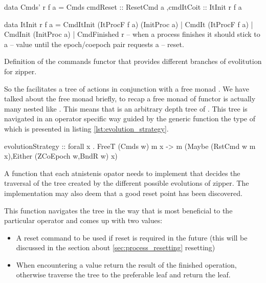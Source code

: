 \begin{code}
\begin{haskellcode}
data Cmds' r f a =
  Cmds { cmdReset :: ResetCmd a
        ,cmdItCoit :: ItInit r f a
       }

data ItInit r f a
  = CmdItInit (ItProcF f a) (InitProc a)
  | CmdIt (ItProcF f a)
  | CmdInit (InitProc a)
  | CmdFinished r -- when a process finishes it should stick to a
                  -- value until the epoch/coepoch pair requests a
                  -- reset.
\end{haskellcode}
\label{lst:cmds_def}
\caption{Definition of the commands functor that provides different
  branches of evolitution for zipper.}
\end{code}

So the  facilitates a tree of actions in conjunction with a
free monad .  We have talked about the free monad briefly, to recap a
free monad of functor  is actually many  nested like
. This means that  is
an arbitrary depth tree of . This tree is navigated in an
operator specific way guided by the generic function
 the type of which is presented in listing
\ref{lst:evolution_strategy}.

\begin{code}
\begin{haskellcode}
evolutionStrategy
  :: forall x .
  FreeT (Cmds w) m x
  -> m (Maybe (RstCmd w m x),Either (ZCoEpoch w,BndR w) x)
\end{haskellcode}
\label{lst:evolution_strategy}
\caption{A function that each atnistenis opator needs to implement
  that decides the traversal of the tree created by the different
  possible evolutions of zipper. The implementation may also deem that
  a good reset point has been discovered.}
\end{code}

This function navigates the tree in the way that is most beneficial to
the particular operator and comes up with two values:

\begin{itemize}
\item A reset command to be used if reset is required in the future
  (this will be discussed in the section about
  \ref{sec:process_resetting} resetting)
\item When encountering a  value return the result of the
finished operation, otherwise traverse the tree to the preferable
leaf and return the leaf.
\end{itemize}

